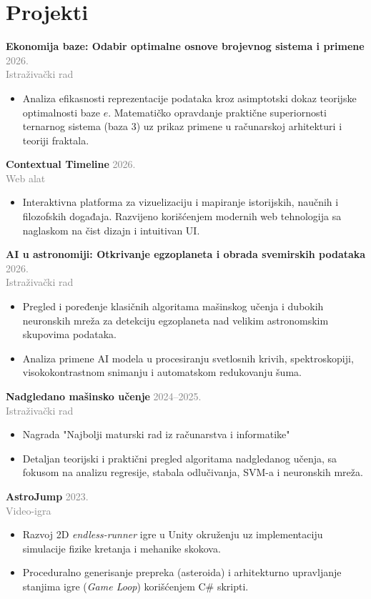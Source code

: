 \documentclass[10pt, letterpaper]{article}
\newcommand{\entry}[4]{
  \vspace{1.5ex}
  \noindent\textbf{#1} \hfill \textcolor{graytext}{\small #2} \\
  \noindent\textit{#3} \hfill \textcolor{graytext}{\small #4}
  \vspace{0.5ex}
}
\begin{document}
\section*{Projekti}

\entry{Ekonomija baze: Odabir optimalne osnove brojevnog sistema i primene}{2026.}{}{Istraživački rad}
\begin{itemize}[leftmargin=1.5em, topsep=0.2ex, itemsep=0.2ex]
    \item Analiza efikasnosti reprezentacije podataka kroz asimptotski dokaz teorijske optimalnosti baze $e$. Matematičko opravdanje praktične superiornosti ternarnog sistema (baza 3) uz prikaz primene u računarskoj arhitekturi i teoriji fraktala.
\end{itemize}

\entry{Contextual Timeline}{2026.}{}{Web alat}
\begin{itemize}[leftmargin=1.5em, topsep=0.2ex, itemsep=0.2ex]
    \item Interaktivna platforma za vizuelizaciju i mapiranje istorijskih, naučnih i filozofskih događaja. Razvijeno korišćenjem modernih web tehnologija sa naglaskom na čist dizajn i intuitivan UI.
\end{itemize}


\entry{AI u astronomiji: Otkrivanje egzoplaneta i obrada svemirskih podataka}{2026.}{}{Istraživački rad}
\begin{itemize}[leftmargin=1.5em, topsep=0.2ex, itemsep=0.2ex]
    \item Pregled i poređenje klasičnih algoritama mašinskog učenja i dubokih neuronskih mreža za detekciju egzoplaneta nad velikim astronomskim skupovima podataka.
    \item Analiza primene AI modela u procesiranju svetlosnih krivih, spektroskopiji, visokokontrastnom snimanju i automatskom redukovanju šuma.
\end{itemize}


\entry{Nadgledano mašinsko učenje}{2024--2025.}{}{Istraživački rad}
\begin{itemize}[leftmargin=1.5em, topsep=0.2ex, itemsep=0.2ex]
    \item Nagrada "Najbolji maturski rad iz računarstva i informatike"
    \item Detaljan teorijski i praktični pregled algoritama nadgledanog učenja, sa fokusom na analizu regresije, stabala odlučivanja, SVM-a i neuronskih mreža.
\end{itemize}

\entry{AstroJump}{2023.}{}{Video-igra}
\begin{itemize}[leftmargin=1.5em, topsep=0.2ex, itemsep=0.2ex]
    \item Razvoj 2D \textit{endless-runner} igre u Unity okruženju uz implementaciju simulacije fizike kretanja i mehanike skokova.
    \item Proceduralno generisanje prepreka (asteroida) i arhitekturno upravljanje stanjima igre (\textit{Game Loop}) korišćenjem C\# skripti.
\end{itemize}
\end{document}
